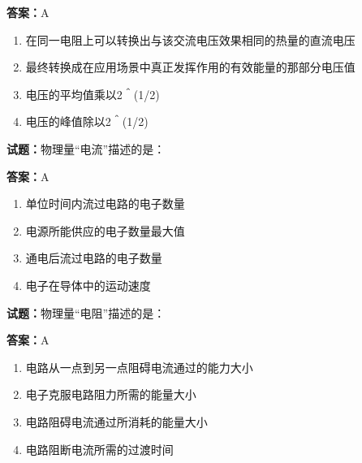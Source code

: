 \documentclass{ctexbook}
\begin{document}
\textbf{答案：}A 

\begin{enumerate}[leftmargin=3em]
  \item 在同一电阻上可以转换出与该交流电压效果相同的热量的直流电压 

  \item 最终转换成在应用场景中真正发挥作用的有效能量的那部分电压值 

  \item 电压的平均值乘以2＾(1/2) 

  \item 电压的峰值除以2＾(1/2) 

\end{enumerate}





\vspace{1em}

\textbf{试题：}物理量“电流”描述的是： 

\textbf{答案：}A 

\begin{enumerate}[leftmargin=3em]
  \item 单位时间内流过电路的电子数量 

  \item 电源所能供应的电子数量最大值 

  \item 通电后流过电路的电子数量 

  \item 电子在导体中的运动速度 

\end{enumerate}





\vspace{1em}

\textbf{试题：}物理量“电阻”描述的是： 

\textbf{答案：}A 

\begin{enumerate}[leftmargin=3em]
  \item 电路从一点到另一点阻碍电流通过的能力大小 

  \item 电子克服电路阻力所需的能量大小 


  \item 电路阻碍电流通过所消耗的能量大小 

  \item 电路阻断电流所需的过渡时间 

\end{enumerate}
\end{document}
